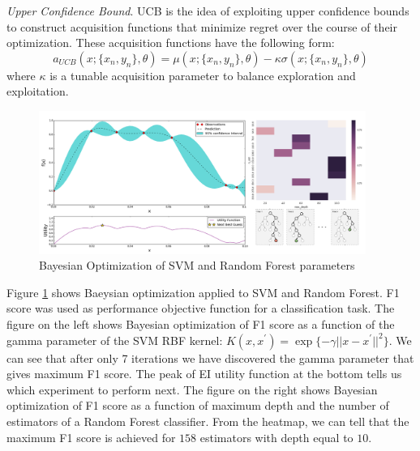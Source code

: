 \textit{Upper Confidence Bound}. UCB is the idea of exploiting upper confidence bounds to construct acquisition functions that minimize regret over the course of their optimization. These acquisition functions have the following form:
\begin{equation}
    a_{UCB}(x;\{x_n,y_n\},\theta) = \mu(x;\{x_n,y_n\},\theta) - \kappa \sigma(x;\{x_n,y_n\},\theta)
\end{equation}
where $\kappa$ is a tunable acquisition parameter to balance exploration and exploitation.\\


\begin{figure}[tbhp]
    \centering
    \includegraphics[width=0.95\textwidth, trim={10 10 10 10}]{figures/bayes_opt.png}
    \caption{Bayesian Optimization of SVM and Random Forest parameters}
    \label{fig:bayes_opt}
\end{figure}

Figure \ref{fig:bayes_opt} shows Baeysian optimization applied to SVM and Random Forest. F1 score was used as performance objective function for a classification task. The figure on the left shows Bayesian optimization of F1 score as a function of the gamma parameter of the SVM RBF kernel: $K(x,x^{\prime}) = \exp\{-\gamma ||x-x^{\prime}||^{2}\}$. We can see that after only 7 iterations we have discovered the gamma parameter that gives maximum F1 score. The peak of EI utility function at the bottom tells us which experiment to perform next. The figure on the right shows Bayesian optimization of F1 score as a function of maximum depth and the number of estimators of a Random Forest classifier. From the heatmap, we can tell that the maximum F1 score is achieved for $158$ estimators with depth equal to $10$.    
















